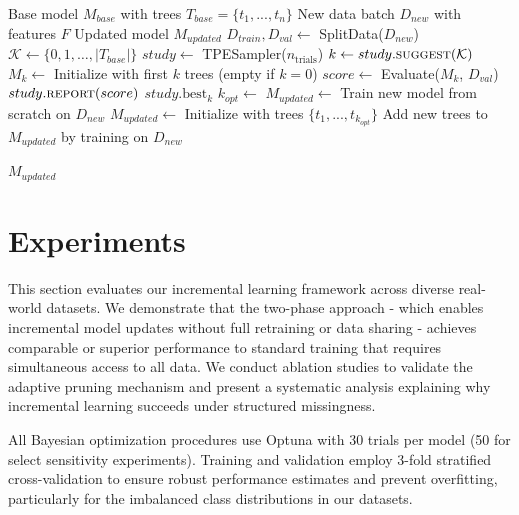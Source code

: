 \documentclass[sigconf]{acmart}
\begin{document}
\begin{itemize}
\begin{algorithm}[t]
\caption{Adaptive Tree Pruning for Incremental Learning in Gradient Boosting}
\begin{algorithmic}[1]
\Require Base model $M_{base}$ with trees $T_{base} = \{t_1,...,t_n\}$
\Require New data batch $D_{new}$ with features $F$
\Ensure Updated model $M_{updated}$
    \State $D_{train}, D_{val} \gets$ SplitData($D_{new}$)
    \State $\mathcal{K} \gets \{0, 1, \dots, |T_{base}|\}$ 
    \State $study \gets$ TPESampler($n_\text{trials}$) 
        \State $k \gets study.\textproc{suggest}(\mathcal{K})$
        \State $M_k \gets$ Initialize with first $k$ trees (empty if $k=0$)
        \State $score \gets$ Evaluate($M_k$, $D_{val}$)
        \State $study.\textproc{report}(score)$
    \EndFor
    \State \Return $study.\text{best}_k$
\EndFunction
\State $k_{opt} \gets$ 
    \State $M_{updated} \gets$ Train new model from scratch on $D_{new}$
\Else
    \State $M_{updated} \gets$ Initialize with trees $\{t_1,...,t_{k_{opt}}\}$
    \State Add new trees to $M_{updated}$ by training on $D_{new}$

\EndIf
\State \Return $M_{updated}$
\end{algorithmic}
\end{algorithm}




\section{Experiments}
This section evaluates our incremental learning framework across diverse real-world datasets. We demonstrate that the two-phase approach - which enables incremental model updates without full retraining or data sharing - achieves comparable or superior performance to standard training that requires simultaneous access to all data. We conduct ablation studies to validate the adaptive pruning mechanism and present a systematic analysis explaining why incremental learning succeeds under structured missingness.

All Bayesian optimization procedures use Optuna\cite{optuna} with 30 trials per model (50 for select sensitivity experiments). Training and validation employ 3-fold stratified cross-validation to ensure robust performance estimates and prevent overfitting, particularly for the imbalanced class distributions in our datasets.

\end{itemize}
\end{document}

